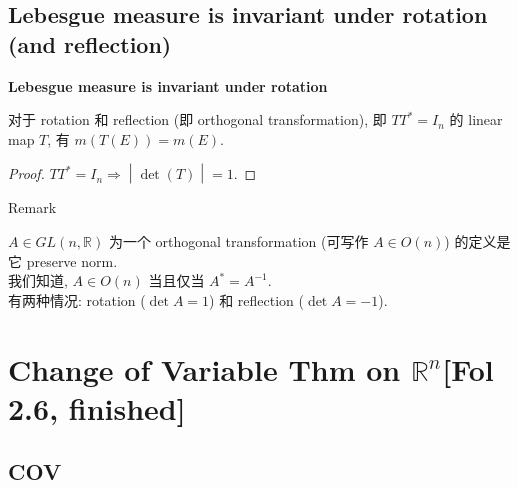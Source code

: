 \documentclass{qlnotes-export}
\begin{document}
\subsection{Lebesgue measure is invariant under rotation (and reflection)}\label{lebesgue-measure-is-invariant-under-rotation-and-reflection}

\begin{corollary}{\protect{}\label{kn-lebesgue-measure-is-invariant-under-rotation}{\textbf{Lebesgue
measure is invariant under rotation}}}

对于 rotation 和 reflection (即 orthogonal transformation), 即 \(TT^{\ast} = I_{n}\) 的 linear map \(T\), 有 \(m(T(E)) = m(E)\).

\end{corollary}

\begin{proof}

\(\left. TT^{\ast} = I_{n}\Longrightarrow \middle| \det(T) \middle| = 1 \right.\).

\end{proof}

\begin{qlremark}{Remark}

\(A \in GL(n,{\mathbb{R}})\) 为一个 orthogonal transformation (可写作 \(A \in O(n)\)) 的定义是它 preserve norm.\\
我们知道, \(A \in O(n)\) 当且仅当 \(A^{\ast} = A^{- 1}\).\\
有两种情况: rotation (\(\det A = 1\)) 和 reflection (\(\det A = - 1\)).\\

\end{qlremark}

\section{\texorpdfstring{Change of Variable Thm on \({\mathbb{R}}^{n}\){[}Fol 2.6, finished{]}}{Change of Variable Thm on \{\textbackslash mathbb\{R\}\}\^{}\{n\}{[}Fol 2.6, finished{]}}}

\subsection{COV}\label{cov}
\end{document}
